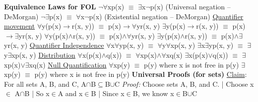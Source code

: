 \documentclass{article}
\begin{document}
\textbf{Equivalence Laws for FOL}\newline
$\neg$$\forall$xp(x) $\equiv$ $\exists$x$\neg$p(x) (Universal negation -- DeMorgan)\newline
$\neg$$\exists$p(x) $\equiv$ $\forall$x$\neg$p(x) (Existential negation -- DeMorgan)\newline\newline
\underline{Quantifier movement}\newline
$\forall$y(p(x)$\rightarrow$r(x, y)) $\equiv$ p(x)$\rightarrow$$\forall$yr(x, y)\newline
$\exists$y(p(x)$\rightarrow$r(x, y)) $\equiv$ p(x)$\rightarrow$$\exists$yr(x, y)\newline
$\forall$y(p(x)$\wedge$r(x, y)) $\equiv$ p(x)$\wedge$$\forall$yr(x, y)\newline
$\exists$y(p(x)$\wedge$r(x, y)) $\equiv$ p(x)$\wedge$$\exists$yr(x, y)\newline\newline
\underline{Quantifier Independence}\newline
$\forall$x$\forall$yp(x, y) $\equiv$ $\forall$y$\forall$xp(x, y)\newline
$\exists$x$\exists$yp(x, y) $\equiv$ $\exists$y$\exists$xp(x, y)\newline\newline
\underline{Distribution}\newline
$\forall$x(p(x)$\wedge$q(x)) $\equiv$ $\forall$xp(x)$\wedge$$\forall$xq(x)\newline
$\exists$x(p(x)$\lor$q(x)) $\equiv$ $\exists$xp(x)$\lor$$\exists$xq(x)\newline\newline
\underline{Null Quantification}\newline
$\forall$xp(y) $\equiv$ p(y) where x is not free in p(y)\newline
$\exists$xp(y) $\equiv$ p(y) where x is not free in p(y)\newline\newline
\textbf{Universal Proofs (for sets)}\newline
\underline{Claim}: For all sets A, B, and C, A$\cap$B$\subseteq$B$\cup$C\newline
\textit{Proof: } Choose sets A, B, and C.\newline
|	Choose x $\in$ A$\cap$B\newline
|	So x$\in$A and x$\in$B\newline
|	Since x$\in$B, we know x$\in$B$\cup$C\newline
\end{document}
